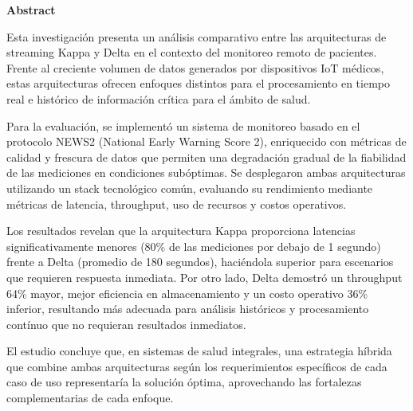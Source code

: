 
\begin{center}
    \Large\bfseries Abstract
\end{center}
\vspace{1cm}


Esta investigación presenta un análisis comparativo entre las arquitecturas de streaming Kappa y Delta en el contexto del monitoreo remoto de pacientes. 
Frente al creciente volumen de datos generados por dispositivos IoT médicos, estas arquitecturas ofrecen enfoques distintos para el procesamiento en tiempo real e histórico de información crítica para el ámbito de salud.\newline

Para la evaluación, se implementó un sistema de monitoreo basado en el protocolo NEWS2 (National Early Warning Score 2), enriquecido con métricas de calidad y frescura de datos que permiten una degradación gradual de la fiabilidad de las mediciones en condiciones subóptimas. 
Se desplegaron ambas arquitecturas utilizando un stack tecnológico común, 
evaluando su rendimiento mediante métricas de latencia, throughput, uso de recursos y costos operativos.\newline

Los resultados revelan que la arquitectura Kappa proporciona latencias significativamente menores (80\% de las mediciones por debajo de 1 segundo) frente a Delta (promedio de 180 segundos), 
haciéndola superior para escenarios que requieren respuesta inmediata. 
Por otro lado, Delta demostró un throughput 64\% mayor, mejor eficiencia en almacenamiento y un costo operativo 36\% inferior, 
resultando más adecuada para análisis históricos y procesamiento contínuo que no requieran resultados inmediatos.\newline

El estudio concluye que, en sistemas de salud integrales, una estrategia híbrida que combine ambas arquitecturas según los requerimientos específicos de cada caso de uso representaría la solución óptima, 
aprovechando las fortalezas complementarias de cada enfoque.

\newpage